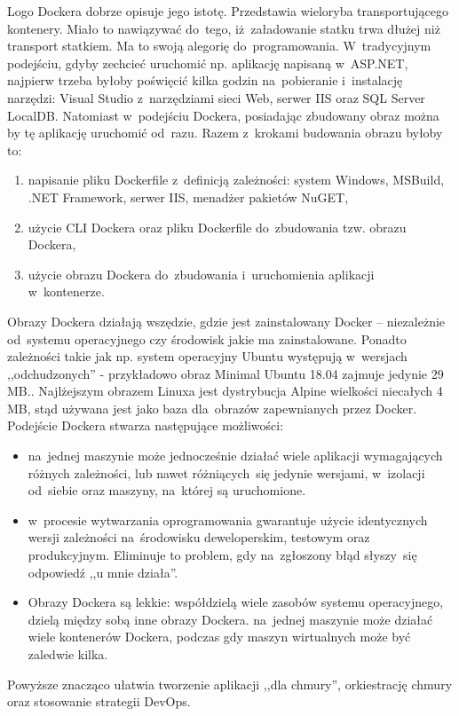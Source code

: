 \documentclass[12pt,a4paper,twoside,titlepage,openright]{book}
\begin{document}
Logo Dockera dobrze opisuje jego istotę. Przedstawia wieloryba transportującego kontenery. Miało to nawiązywać do~tego, iż~załadowanie statku trwa dłużej niż transport statkiem. Ma to swoją alegorię do~programowania. W~tradycyjnym podejściu, gdyby zechcieć uruchomić np. aplikację napisaną w~ASP.NET, najpierw trzeba byłoby poświęcić kilka godzin na~pobieranie i~instalację narzędzi: Visual Studio z~narzędziami sieci Web, serwer IIS oraz SQL Server LocalDB. Natomiast w~podejściu Dockera, posiadając zbudowany obraz można by tę aplikację uruchomić od~razu. Razem z~krokami budowania obrazu byłoby to:
\begin{enumerate}
\item napisanie pliku Dockerfile z~definicją zależności: system Windows, MSBuild, .NET Framework, serwer IIS, menadżer pakietów NuGET,
\item użycie CLI Dockera oraz pliku Dockerfile do~zbudowania tzw. obrazu Dockera,
\item użycie obrazu Dockera do~zbudowania i~uruchomienia aplikacji w~kontenerze.
\end{enumerate}
Obrazy Dockera działają wszędzie, gdzie jest zainstalowany Docker -- niezależnie od~systemu operacyjnego czy środowisk jakie ma zainstalowane. Ponadto zależności takie jak np. system operacyjny Ubuntu występują w~wersjach ,,odchudzonych'' - przykładowo obraz Minimal Ubuntu 18.04 zajmuje jedynie 29 MB.\cite{siteUbuntuBlog}. Najlżejszym obrazem Linuxa jest dystrybucja Alpine wielkości niecałych 4 MB, stąd używana jest jako baza dla~obrazów zapewnianych przez Docker.\cite{dockerPacktMastering}
Podejście Dockera stwarza następujące możliwości:
\begin{itemize}
\item na~jednej maszynie może jednocześnie działać wiele aplikacji wymagających różnych zależności, lub nawet różniących~się jedynie wersjami, w~izolacji od~siebie oraz maszyny, na~której są uruchomione.
\item w~procesie wytwarzania oprogramowania gwarantuje użycie identycznych wersji zależności na~środowisku deweloperskim, testowym oraz produkcyjnym. Eliminuje to problem, gdy na~zgłoszony błąd słyszy~się odpowiedź ,,u mnie działa''.
\item Obrazy Dockera są lekkie: współdzielą wiele zasobów systemu operacyjnego, dzielą między sobą inne obrazy Dockera.\cite{siteDockerStackOverflow} na~jednej maszynie może działać wiele kontenerów Dockera, podczas gdy maszyn wirtualnych może być zaledwie kilka.\cite{ccSpringer}
\end{itemize}
Powyższe znacząco ułatwia tworzenie aplikacji ,,dla chmury'', orkiestrację chmury oraz stosowanie strategii DevOps.
\end{document}
